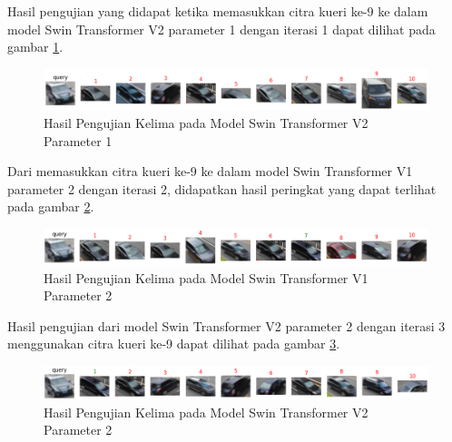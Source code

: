 Hasil pengujian yang didapat ketika memasukkan citra kueri ke-9 ke dalam model Swin Transformer V2 parameter 1 dengan 
iterasi 1 dapat dilihat pada gambar \ref{fig:hasilpengujiankelimapadamodelswintransformerv2param1}.

\begin{figure}[h!]
  \centering
  \includegraphics[scale=0.6]{gambar/Que9V2P1IT1.png}
  \caption{Hasil Pengujian Kelima pada Model Swin Transformer V2 Parameter 1}
  \label{fig:hasilpengujiankelimapadamodelswintransformerv2param1}
\end{figure}

Dari memasukkan citra kueri ke-9 ke dalam model Swin Transformer V1 parameter 2 dengan iterasi 2, didapatkan hasil 
peringkat yang dapat terlihat pada gambar \ref{fig:hasilpengujiankelimapadamodelswintransformerv1param2}.

\begin{figure}[h!]
  \centering
  \includegraphics[scale=0.6]{gambar/Que9V1P2IT2.png}
  \caption{Hasil Pengujian Kelima pada Model Swin Transformer V1 Parameter 2}
  \label{fig:hasilpengujiankelimapadamodelswintransformerv1param2}
\end{figure}

Hasil pengujian dari model Swin Transformer V2 parameter 2 dengan iterasi 3 menggunakan citra kueri ke-9 dapat 
dilihat pada gambar \ref{fig:hasilpengujiankelimapadamodelswintransformerv2param2}.

\begin{figure}[h!]
  \centering
  \includegraphics[scale=0.6]{gambar/Que9V2P2IT3.png}
  \caption{Hasil Pengujian Kelima pada Model Swin Transformer V2 Parameter 2}
  \label{fig:hasilpengujiankelimapadamodelswintransformerv2param2}
\end{figure}

